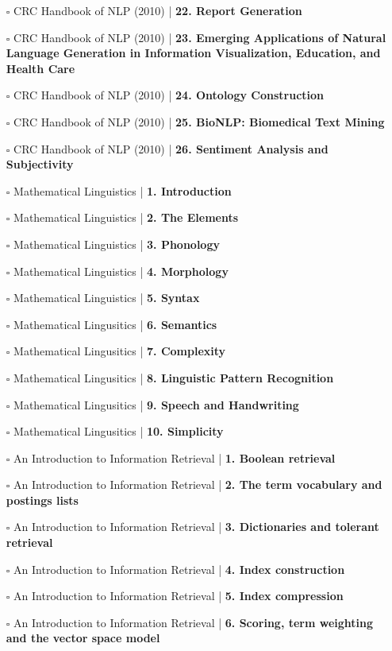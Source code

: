 \documentclass[a4, landscape, 12pt]{article}
\newcommand{\checkbox}{$\square$}%
\begin{document}
\begin{itemize}
{}
\item [\checkbox]  CRC Handbook of NLP (2010) | \textbf{ 22. Report Generation
}
\item [\checkbox]  CRC Handbook of NLP (2010) | \textbf{ 23. Emerging Applications of Natural Language Generation in Information Visualization, Education, and Health Care
}
\item [\checkbox]  CRC Handbook of NLP (2010) | \textbf{ 24. Ontology Construction
}
\item [\checkbox]  CRC Handbook of NLP (2010) | \textbf{ 25. BioNLP: Biomedical Text Mining
}
\item [\checkbox]  CRC Handbook of NLP (2010) | \textbf{ 26. Sentiment Analysis and Subjectivity
}
\item [\checkbox]  Mathematical Linguistics | \textbf{ 1. Introduction
}
\item [\checkbox]  Mathematical Linguistics | \textbf{ 2. The Elements
}
\item [\checkbox]  Mathematical Linguistics | \textbf{ 3. Phonology
}
\item [\checkbox]  Mathematical Linguistics | \textbf{ 4. Morphology
}
\item [\checkbox]  Mathematical Linguistics | \textbf{ 5. Syntax
}
\item [\checkbox]  Mathematical Lingusitics | \textbf{ 6. Semantics
}
\item [\checkbox]  Mathematical Lingusitics | \textbf{ 7. Complexity
}
\item [\checkbox]  Mathematical Lingusitics | \textbf{ 8. Linguistic Pattern Recognition
}
\item [\checkbox]  Mathematical Lingusitics | \textbf{ 9. Speech and Handwriting
}
\item [\checkbox]  Mathematical Lingusitics | \textbf{ 10. Simplicity
}
\item [\checkbox]  An Introduction to Information Retrieval | \textbf{ 1. Boolean retrieval
}
\item [\checkbox]  An Introduction to Information Retrieval | \textbf{ 2. The term vocabulary and postings lists
}
\item [\checkbox]  An Introduction to Information Retrieval | \textbf{ 3. Dictionaries and tolerant retrieval
}
\item [\checkbox]  An Introduction to Information Retrieval | \textbf{ 4. Index construction
}
\item [\checkbox]  An Introduction to Information Retrieval | \textbf{ 5. Index compression
}
\item [\checkbox]  An Introduction to Information Retrieval | \textbf{ 6. Scoring, term weighting and the vector space model
}
\end{itemize}
\end{document}
